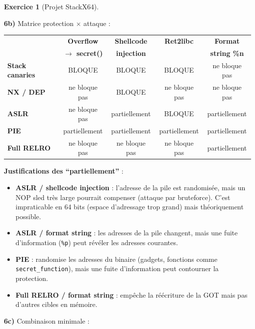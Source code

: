 \documentclass[a4paper,11pt]{article}
\theoremstyle{plain}
\theoremstyle{definition}
\newtheorem{exercice}{Exercice}
\begin{document}
\begin{exercice}[Projet StackX64]
\begin{correction}
\textbf{6b)} Matrice protection $\times$ attaque :

\begin{center}
\begin{tabular}{l|c|c|c|c}
\toprule
& \textbf{Overflow} & \textbf{Shellcode} & \textbf{Ret2libc} & \textbf{Format} \\
& \textbf{$\to$ secret()} & \textbf{injection} & & \textbf{string \%n} \\
\midrule
\textbf{Stack canaries} & BLOQUE & BLOQUE & BLOQUE & ne bloque pas \\
\midrule
\textbf{NX / DEP} & ne bloque pas & BLOQUE & ne bloque pas & ne bloque pas \\
\midrule
\textbf{ASLR} & ne bloque pas & partiellement & BLOQUE & partiellement \\
\midrule
\textbf{PIE} & partiellement & partiellement & partiellement & partiellement \\
\midrule
\textbf{Full RELRO} & ne bloque pas & ne bloque pas & ne bloque pas & partiellement \\
\bottomrule
\end{tabular}
\end{center}

\textbf{Justifications des ``partiellement''} :
\begin{itemize}
    \item \textbf{ASLR / shellcode injection} : l'adresse de la pile est randomisée, mais un NOP sled très large pourrait compenser (attaque par bruteforce). C'est impraticable en 64 bits (espace d'adressage trop grand) mais théoriquement possible.
    \item \textbf{ASLR / format string} : les adresses de la pile changent, mais une fuite d'information (\texttt{\%p}) peut révéler les adresses courantes.
    \item \textbf{PIE} : randomise les adresses du binaire (gadgets, fonctions comme \texttt{secret\_function}), mais une fuite d'information peut contourner la protection.
    \item \textbf{Full RELRO / format string} : empêche la réécriture de la GOT mais pas d'autres cibles en mémoire.
\end{itemize}

\textbf{6c)} Combinaison minimale :


\end{correction}
\end{exercice}
\end{document}
